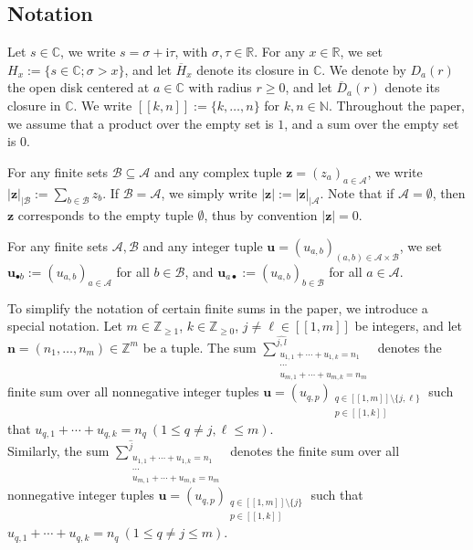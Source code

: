 \documentclass[a4paper]{amsart}
\theoremstyle{remark}
\theoremstyle{definition}
\newcommand{\phii}{\mathrm{i}}
\begin{document}
\subsection{Notation}
Let $s \in \mathbb{C}$, we write $s = \sigma + \phii \tau$, with $\sigma, \tau \in \mathbb{R}$. For any $x \in \mathbb{R}$, we set $H_x := \{ s \in \mathbb{C}; \sigma > x \}$, and let $\overline{H}_x$ denote its closure in $\mathbb{C}$. We denote by $D_{a}(r)$ the open disk centered at $a \in \mathbb{C}$ with radius $r \geq 0$, and let $\overline{D}_a(r)$ denote its closure in $\mathbb{C}$. We write $[\![k,n]\!]:=\{k,\ldots,n\}$ for $k,n \in \mathbb{N}$. Throughout the paper, we assume that a product over the empty set is $1$, and a sum over the empty set is $0$.

For any finite sets $\mathcal{B} \subseteq \mathcal{A}$ and any complex tuple $\mathbf{z}=(z_a)_{a \in \mathcal{A}}$, we write $|\mathbf{z}|_{|\mathcal{B}} := \sum_{b \in \mathcal{B}} z_b$. If $\mathcal{B}=\mathcal{A}$, we simply write $|\mathbf{z}| := |\mathbf{z}|_{|\mathcal{A}}$. Note that if $\mathcal{A}=\emptyset$, then $\mathbf{z}$ corresponds to the empty tuple $\emptyset$, thus by convention $|\mathbf{z}|=0$.

For any finite sets $\mathcal{A}, \mathcal{B}$ and any integer tuple $\mathbf{u}=(u_{a,b})_{(a,b) \in \mathcal{A} \times \mathcal{B}}$, we set $\mathbf{u}_{\bullet b} := (u_{a,b})_{a \in \mathcal{A}}$ for all $b \in \mathcal{B}$, and $\mathbf{u}_{a \bullet} := (u_{a,b})_{b \in \mathcal{B}}$ for all $a \in \mathcal{A}$.

To simplify the notation of certain finite sums in the paper, we introduce a special notation. Let $m \in \mathbb{Z}_{\geq 1}$, $k \in \mathbb{Z}_{\geq 0}$, $j \neq \ell \in [\![ 1,m ]\!]$ be integers, and let $\mathbf{n}=(n_1,\ldots,n_m) \in \mathbb{Z}^{m}$ be a tuple. The sum $\displaystyle{\sum^{\widehat{j,l}}_{\substack{u_{1,1}+\cdots+u_{1,k}=n_1 \\ \cdots \\ u_{m,1}+\cdots+u_{m,k}=n_m}}}$ denotes the finite sum over all nonnegative integer tuples $\mathbf{u}=(u_{q,p})_{\substack{q \in [\![ 1,m ]\!] \setminus \{ j,\ell \} \\ p \in [\![ 1,k ]\!]}}$ such that $u_{q,1}+\cdots+u_{q,k}=n_q \ (1 \leq q \neq j,\ell \leq m)$. \\
Similarly, the sum $\displaystyle{\sum^{\widehat{j}}_{\substack{u_{1,1}+\cdots+u_{1,k}=n_1 \\ \cdots \\ u_{m,1}+\cdots+u_{m,k}=n_m}}}$ denotes the finite sum over all nonnegative integer tuples $\mathbf{u}=(u_{q,p})_{\substack{q \in [\![ 1,m ]\!] \setminus \{ j \} \\ p \in [\![ 1,k ]\!]}}$ such that $u_{q,1}+\cdots+u_{q,k}=n_q \ (1 \leq q \neq j \leq m)$.
\end{document}
